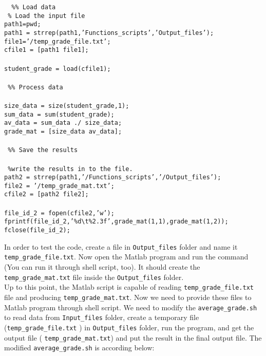  \begin{mdframed}[hidealllines=true,backgroundcolor=gray!20]
 \begin{singlespace}
 \fontsize{10pt}{1pt}
 \texttt{
{ \color{matlab_green}\%\% Load data}\\
{ \color{matlab_green}\% Load the input file}\\
path1=pwd;\\
path1 = strrep(path1,{\color{matlab_pink}'Functions\_scripts'},{\color{matlab_pink}'Output\_files'}); \\
file1={\color{matlab_pink}'/temp\_grade\_file.txt'};\\
cfile1 = [path1 file1];\\
\\
student\_grade = load(cfile1);\\
\\
{ \color{matlab_green}\%\% Process data}\\
\\
size\_data = size(student\_grade,1);\\
sum\_data = sum(student\_grade);\\
av\_data = sum\_data ./ size\_data;\\
grade\_mat = [size\_data av\_data];\\
\\
{ \color{matlab_green}\%\% Save the results}\\
\\
{ \color{matlab_green}\%write the results in to the file.} \\
path2 = strrep(path1,{\color{matlab_pink}'/Functions\_scripts'},{\color{matlab_pink}'/Output\_files'});\\ 
file2 = {\color{matlab_pink}'/temp\_grade\_mat.txt'};\\
cfile2 = [path2 file2];\\
\\
file\_id\_2 = fopen(cfile2,{\color{matlab_pink}'w'});\\
fprintf(file\_id\_2,{\color{matlab_pink}'\%d\textbackslash t\%2.3f'},grade\_mat(1,1),grade\_mat(1,2));\\
fclose(file\_id\_2);
}
\end{singlespace}
\end{mdframed}
\noindent
In order to test the code, create a file in \texttt{Output\_files} folder and name it \texttt{temp\_grade\_file.txt}. Now open the Matlab program and run the command (You can run it through shell script, too). It should create the \texttt{temp\_grade\_mat.txt} file inside the  \texttt{Output\_files} folder. \\
Up to this point, the Matlab script is capable of reading \texttt{temp\_grade\_file.txt} file and producing \texttt{temp\_grade\_mat.txt}. Now we need to provide these files to Matlab program through shell script. We need to modify the \texttt{average\_grade.sh} to read data from \texttt{Input\_files} folder, create a temporary file (\texttt{temp\_grade\_file.txt} ) in \texttt{Output\_files} folder, run the program, and get the output file ( \texttt{temp\_grade\_mat.txt}) and put the result in the final output file. The modified \texttt{average\_grade.sh} is according below:\\


